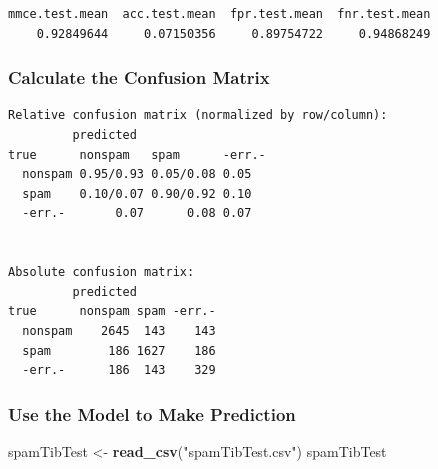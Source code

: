 \documentclass[
]{article}
\newenvironment{Shaded}{\begin{snugshade}}{\end{snugshade}}
\newcommand{\AttributeTok}[1]{\textcolor[rgb]{0.13,0.29,0.53}{#1}}
\newcommand{\ConstantTok}[1]{\textcolor[rgb]{0.56,0.35,0.01}{#1}}
\newcommand{\DecValTok}[1]{\textcolor[rgb]{0.00,0.00,0.81}{#1}}
\newcommand{\FunctionTok}[1]{\textcolor[rgb]{0.13,0.29,0.53}{\textbf{#1}}}
\newcommand{\NormalTok}[1]{#1}
\newcommand{\OtherTok}[1]{\textcolor[rgb]{0.56,0.35,0.01}{#1}}
\newcommand{\SpecialCharTok}[1]{\textcolor[rgb]{0.81,0.36,0.00}{\textbf{#1}}}
\newcommand{\StringTok}[1]{\textcolor[rgb]{0.31,0.60,0.02}{#1}}
\begin{document}
\begin{Shaded}
\end{Shaded}

\begin{verbatim}
mmce.test.mean  acc.test.mean  fpr.test.mean  fnr.test.mean 
    0.92849644     0.07150356     0.89754722     0.94868249 
\end{verbatim}

\subsubsection{Calculate the Confusion
Matrix}\label{calculate-the-confusion-matrix-2}

\begin{Shaded}
\end{Shaded}

\begin{verbatim}
Relative confusion matrix (normalized by row/column):
         predicted
true      nonspam   spam      -err.-   
  nonspam 0.95/0.93 0.05/0.08 0.05     
  spam    0.10/0.07 0.90/0.92 0.10     
  -err.-       0.07      0.08 0.07     


Absolute confusion matrix:
         predicted
true      nonspam spam -err.-
  nonspam    2645  143    143
  spam        186 1627    186
  -err.-      186  143    329
\end{verbatim}

\subsubsection{Use the Model to Make
Prediction}\label{use-the-model-to-make-prediction}

\begin{Shaded}
\begin{Highlighting}[]
\NormalTok{spamTibTest }\OtherTok{\textless{}{-}} \FunctionTok{read\_csv}\NormalTok{(}\StringTok{"spamTibTest.csv"}\NormalTok{)}
\NormalTok{spamTibTest}
\end{Highlighting}
\end{Shaded}
\end{document}
